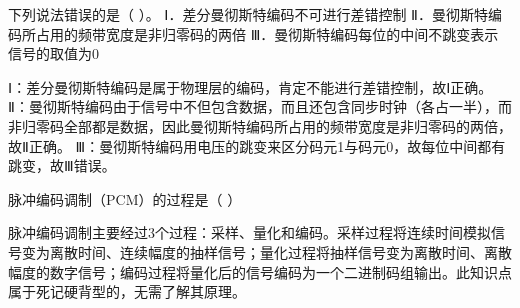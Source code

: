 \question 下列说法错误的是（ ）。 Ⅰ．差分曼彻斯特编码不可进行差错控制
Ⅱ．曼彻斯特编码所占用的频带宽度是非归零码的两倍
Ⅲ．曼彻斯特编码每位的中间不跳变表示信号的取值为0
\par{}
\begin{solution}Ⅰ：差分曼彻斯特编码是属于物理层的编码，肯定不能进行差错控制，故Ⅰ正确。
Ⅱ：曼彻斯特编码由于信号中不但包含数据，而且还包含同步时钟（各占一半），而非归零码全部都是数据，因此曼彻斯特编码所占用的频带宽度是非归零码的两倍，故Ⅱ正确。
Ⅲ：曼彻斯特编码用电压的跳变来区分码元1与码元0，故每位中间都有跳变，故Ⅲ错误。
\end{solution}
\question 脉冲编码调制（PCM）的过程是（ ）
\par{}
\begin{solution}脉冲编码调制主要经过3个过程：采样、量化和编码。采样过程将连续时间模拟信号变为离散时间、连续幅度的抽样信号；量化过程将抽样信号变为离散时间、离散幅度的数字信号；编码过程将量化后的信号编码为一个二进制码组输出。此知识点属于死记硬背型的，无需了解其原理。
\end{solution}
